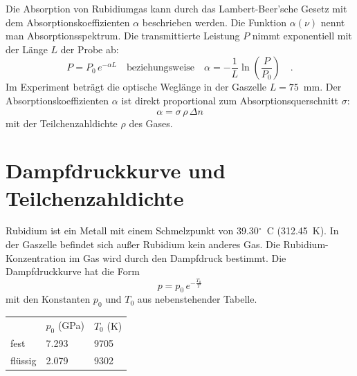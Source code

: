 Die Absorption von Rubidiumgas kann durch das Lambert-Beer'sche Gesetz mit dem Absorptionskoeffizienten $\alpha$ beschrieben werden. Die Funktion $\alpha(\nu)$ nennt man Absorptionsspektrum. Die transmittierte Leistung $P$ nimmt exponentiell mit der Länge $L$ der Probe ab:
\begin{equation}
	P = P_0  \, e^{- \alpha L} \quad \text{beziehungsweise} \quad 
	\alpha = -\frac{1}{L} \ln \left( \frac{P}{P_0} \right) \quad .
	 \label{eq:lambert_beer}
\end{equation}
Im Experiment beträgt die optische Weglänge in der Gaszelle $L=75$~mm.
Der Absorptionskoeffizienten $\alpha$ ist direkt proportional zum Absorptionsquerschnitt $\sigma$:
\begin{equation}
	\alpha = \sigma  \, \rho  \, \Delta n
\end{equation}
mit der Teilchenzahldichte $\rho$ des Gases.



\begin{questions}
\end{questions}


\section{Dampfdruckkurve und Teilchenzahldichte}

Rubidium ist ein Metall mit einem Schmelzpunkt von 39.30$^\circ$~C (312.45~K). In der Gaszelle befindet sich außer Rubidium kein anderes Gas. Die Rubidium-Konzentration im Gas wird durch den Dampfdruck bestimmt. Die Dampfdruckkurve hat die Form
\begin{equation}
    p = p_0 \, e^{- \frac{T_0}{T}}
\end{equation}
mit den Konstanten $p_0$ und $T_0$ aus nebenstehender Tabelle. 

\begin{margintable}
    \begin{tabular}{lll}
           & $p_0$ (GPa) & $T_0$ (K) \\
           fest  &  7.293   & 9705 \\
           flüssig  &  2.079  & 9302 \\
    \end{tabular}
	\caption{Parameter zur Dampfdruckkurve, aus \cite{Data85}.}
\end{margintable}



